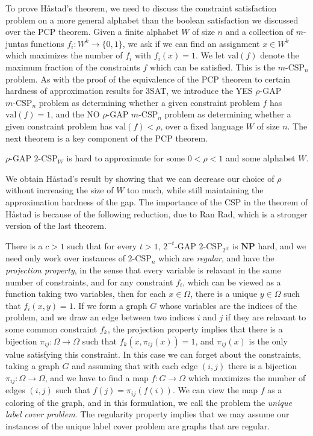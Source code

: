 To prove Håstad's theorem, we need to discuss the constraint satisfaction problem on a more general alphabet than the boolean satisfaction we discussed over the PCP theorem. Given a finite alphabet $W$ of size $n$ and a collection of $m$-juntas functions $f_i: W^k \to \{ 0, 1 \}$, we ask if we can find an assignment $x \in W^k$ which maximizes the number of $f_i$ with $f_i(x) = 1$.  We let $\text{val}(f)$ denote the maximum fraction of the constraints $f$ which can be satisfied. This is the $m\text{-CSP}_n$ problem. As with the proof of the equivalence of the PCP theorem to certain hardness of approximation results for 3SAT, we introduce the YES $\rho$-GAP $m\text{-CSP}_n$ problem as determining whether a given constraint problem $f$ has $\text{val}(f) = 1$, and the NO $\rho$-GAP $m\text{-CSP}_n$ problem as determining whether a given constraint problem has $\text{val}(f) < \rho$, over a fixed language $W$ of size $n$. The next theorem is a key component of the PCP theorem.

\begin{theorem}
    $\rho$-GAP $2\text{-CSP}_W$ is hard to approximate for some $0 < \rho < 1$ and some alphabet $W$.
\end{theorem}

We obtain Håstad's result by showing that we can decrease our choice of $\rho$ without increasing the size of $W$ too much, while still maintaining the approximation hardness of the gap. The importance of the CSP in the theorem of Håstad is because of the following reduction, due to Ran Rad, which is a stronger version of the last theorem.

\begin{theorem}
    There is a $c > 1$ such that for every $t > 1$, $2^{-t}$-GAP $2\text{-CSP}_{2^{ct}}$ is $\mathbf{NP}$ hard, and we need only work over instances of $2\text{-CSP}_n$ which are \emph{regular}, and have the \emph{projection property}, in the sense that every variable is relavant in the same number of constraints, and for any constraint $f_i$, which can be viewed as a function taking two variables, then for each $x \in \Omega$, there is a unique $y \in \Omega$ such that $f_i(x,y) = 1$. If we form a graph $G$ whose variables are the indices of the problem, and we draw an edge between two indices $i$ and $j$ if they are relavant to some common constraint $f_k$, the projection property implies that there is a bijection $\pi_{ij}: \Omega \to \Omega$ such that $f_k(x, \pi_{ij}(x)) = 1$, and $\pi_{ij}(x)$ is the only value satisfying this constraint. In this case we can forget about the constraints, taking a graph $G$ and assuming that with each edge $(i,j)$ there is a bijection $\pi_{ij}: \Omega \to \Omega$, and we have to find a map $f: G \to \Omega$ which maximizes the number of edges $(i,j)$ such that $f(j) = \pi_{ij}(f(i))$. We can view the map $f$ as a coloring of the graph, and in this formulation, we call the problem the \emph{unique label cover problem}. The regularity property implies that we may assume our instances of the unique label cover problem are graphs that are regular.
\end{theorem}

